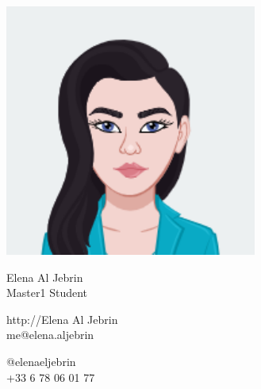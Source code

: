\documentclass{article}
\begin{document}
\centering \includegraphics[width=.25\linewidth]{logo}\\[2pt]
\parbox{2in}{\Large \centering Elena Al Jebrin\\[1pt]
\normalsize Master1 Student}

\vfill
\raggedright
\begin{multicols}{2}
http://Elena Al Jebrin\\
me@elena.aljebrin

\columnbreak
\raggedleft
@elenaeljebrin\\
+33 6 78 06 01 77%
\end{multicols}%
\end{document}
